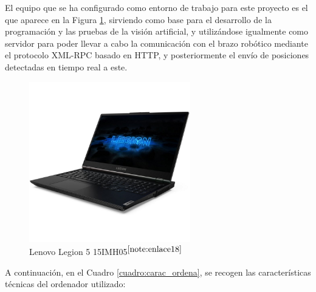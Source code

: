 El equipo que se ha configurado como entorno de trabajo para este proyecto es el que aparece en la Figura \ref{fig:PC_Lenovo}, sirviendo como base para el desarrollo de la programación y las pruebas de la visión artificial, y utilizándose igualmente como servidor para poder llevar a cabo la comunicación con el brazo robótico mediante el protocolo XML-RPC basado en HTTP, y posteriormente el envío de posiciones detectadas en tiempo real a este. 

\begin{figure} [H]
    \begin{center}
      \includegraphics[width=7cm]{figs/Lenovo Legion 5 15imh05.jpg}
    \end{center}
    \caption{Lenovo Legion 5 15IMH05$^{\ref{note:enlace18}}$}
    \label{fig:PC_Lenovo}
\end{figure}

\setcounter{footnote}{18} 

A continuación, en el Cuadro \ref{cuadro:carac_ordena}, se recogen las características técnicas del ordenador utilizado:

